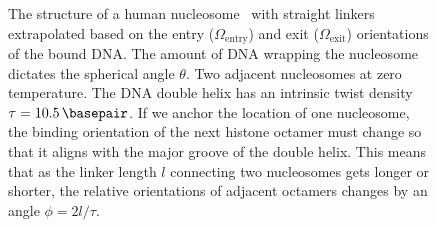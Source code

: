 \documentclass[%
 reprint,
superscriptaddress,
showpacs,preprintnumbers,
 amsmath,amssymb,
 aps,
 prl,
]{revtex4-1}
\begin{document}
\begin{figure}[t]
    \centering
    \hfill{}
    \caption{\protect{} The structure of a
        human nucleosome~\cite{wakamori2015} with straight linkers extrapolated
        based on the entry ($\Omega_\text{entry}$) and exit ($\Omega_\text{exit}$)
        orientations of the bound DNA\@.
    The amount of DNA wrapping the nucleosome dictates the spherical angle
        $\theta$.
    \protect{} Two adjacent nucleosomes at zero
        temperature.
    The DNA double helix has an intrinsic twist density
        $\tau=\SI{10.5}{\basepair}$.
    If we anchor the location of one nucleosome, the
        binding orientation of the next histone octamer must change so that it
        aligns with the major groove of the double helix.
    This means that as the linker length $l$ connecting two nucleosomes gets
        longer or shorter, the relative orientations of adjacent octamers
        changes by an angle $\phi = 2l/\tau$.
    }\label{fig:nuc-geo}
\end{figure}
\end{document}
